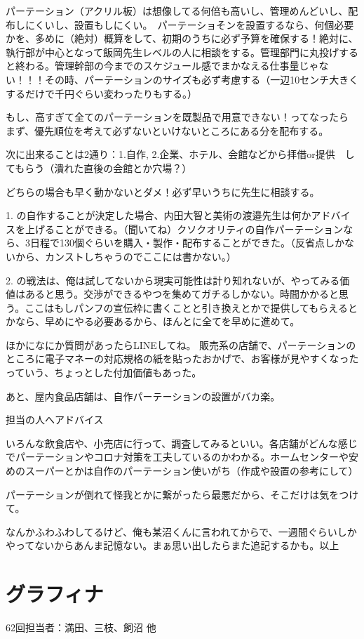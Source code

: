 \documentclass[a4paper]{ltjsreport}
\begin{document}
パーテーション（アクリル板）は想像してる何倍も高いし、管理めんどいし、配布しにくいし、設置もしにくい。　パーテーショそンを設置するなら、何個必要かを、多めに（絶対）概算をして、初期のうちに必ず予算を確保する！絶対に、執行部が中心となって飯岡先生レベルの人に相談をする。管理部門に丸投げすると終わる。管理幹部の今までのスケジュール感でまかなえる仕事量じゃない！！！その時、パーテーションのサイズも必ず考慮する（一辺10センチ大きくするだけで千円ぐらい変わったりもする。）

もし、高すぎて全てのパーテーションを既製品で用意できない！ってなったら
まず、優先順位を考えて必ずないといけないところにある分を配布する。

次に出来ることは2通り：1.自作, 2.企業、ホテル、会館などから拝借or提供　してもらう（潰れた直後の会館とか穴場？）

どちらの場合も早く動かないとダメ！必ず早いうちに先生に相談する。

1. の自作することが決定した場合、内田大智と美術の渡邉先生は何かアドバイスを上げることができる。（聞いてね）クソクオリティの自作パーテーションなら、3日程で130個ぐらいを購入・製作・配布することができた。（反省点しかないから、カンストしちゃうのでここには書かない。）

2. の戦法は、俺は試してないから現実可能性は計り知れないが、やってみる価値はあると思う。交渉ができるやつを集めてガチるしかない。時間かかると思う。ここはもしパンフの宣伝枠に書くことと引き換えとかで提供してもらえるとかなら、早めにやる必要あるから、ほんとに全てを早めに進めて。

ほかになにか質問があったらLINEしてね。
販売系の店舗で、パーテーションのところに電子マネーの対応規格の紙を貼ったおかげで、お客様が見やすくなったっていう、ちょっとした付加価値もあった。

あと、屋内食品店舗は、自作パーテーションの設置がバカ楽。

担当の人へアドバイス

いろんな飲食店や、小売店に行って、調査してみるといい。各店舗がどんな感じでパーテーションやコロナ対策を工夫しているのかわかる。ホームセンターや安めのスーパーとかは自作のパーテーション使いがち（作成や設置の参考にして）

パーテーションが倒れて怪我とかに繋がったら最悪だから、そこだけは気をつけて。

なんかふわふわしてるけど、俺も某沼くんに言われてからで、一週間ぐらいしかやってないからあんま記憶ない。まぁ思い出したらまた追記するかも。以上




\section{グラフィナ}\label{sec:グラフィナ}
62回担当者：満田、三枝、飼沼 他
\end{document}
